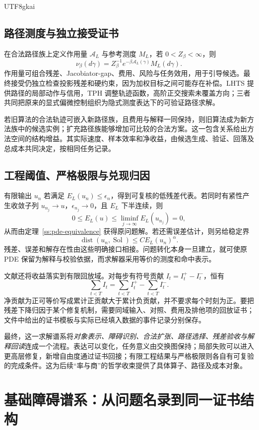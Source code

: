 \documentclass[11pt,a4paper]{article}
\theoremstyle{plain}
\theoremstyle{definition}
\theoremstyle{remark}
\begin{document}
\begin{CJK*}{UTF8}{gkai}
\subsection{路径测度与独立接受证书}

在合法路径族上定义作用量 $\mathcal A_L$ 与参考测度 $M_L$，若 $0<Z_\beta<\infty$，则
\[
 \nu_\beta(d\gamma)=Z_\beta^{-1}e^{-\beta\mathcal A_L(\gamma)}M_L(d\gamma).
\]
作用量可组合残差、Jacobiator-gap、费用、风险与任务效用，用于引导候选。最终接受仍独立检查投影残差和硬约束，因为加权目标之间可能存在补偿。LHTS 提供路径的局部动作与信用，TPH 调整轨迹函数，高阶正交搜索未覆盖方向；三者共同把原来的显式偏微控制组织为隐式测度表达下的可验证路径求解。

若旧算法的合法轨迹可嵌入新路径族，且费用与解释一同保持，则旧算法成为新方法族中的候选实例；扩充路径族能够增加可比较的合法方案。这一包含关系给出方法空间的结构增益。其实际速度、样本效率和净收益，由候选生成、验证、回落及总成本共同决定，按相同任务记录。

\subsection{工程阈值、严格极限与兑现归因}

有限输出 $u_n$ 若满足 $E_L(u_n)\le\epsilon_n$，得到可复核的低残差代表。若同时有紧性产生收敛子列 $u_{n_j}\to u$，$\epsilon_{n_j}\to0$，且 $E_L$ 下半连续，则
\[
 0\le E_L(u)\le\liminf_{j\to\infty}E_L(u_{n_j})=0,
\]
从而由定理~\ref{ss:pde-equivalence} 获得原问题解。若还需误差估计，则另给稳定界
\[
 \operatorname{dist}(u_n,\operatorname{Sol})
 \le C E_L(u_n)^\alpha.
\]
残差、误差和解存在性由这些明确接口相接。问题转化本身一旦建立，就可使原 PDE 保留为解释与校验依据，而求解器采用等价的测度和命中表示。

文献\cite{S36}还将收益落实到有限回放域。对每步有符号贡献 $I_t=I_t^+-I_t^-$，恒有
\[
 \sum_{t<T}I_t=\sum_{t<T}I_t^+-\sum_{t<T}I_t^-.
\]
净贡献为正可等价写成累计正贡献大于累计负贡献，并不要求每个时刻为正。要把残差下降归因于某个修复机制，需要同域输入、对照、费用及排他项的回放证书；文件中给出的证书模板与实际已经填入数据的事件记录分别保存。

最终，这一求解谱系将\emph{对象表示、障碍识别、合法扩张、路径选择、残差验收与解释回读}连成一个流程。表达可以变化，任务意义由交换图保持；局部失败可以进入更高层修复，新增自由度通过证书回接；有限工程结果与严格极限则各自有可复验的完成条件。这为后续“率与商”的哲学收束提供了具体算子、路径及成本对象。


\section{基础障碍谱系：从问题名录到同一证书结构}
\label{pc:spectrum}


\end{CJK*}
\end{document}
